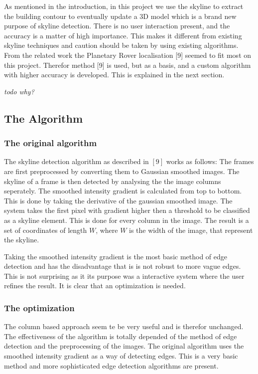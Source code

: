 \documentclass[10pt]{article}
\begin{document}
As mentioned in the introduction, in this project we use the skyline to extract
the building contour to eventually update a 3D model which is a brand new
purpose of skyline detection.  There is no user interaction present, and the
accuracy is a matter of high importance.  This makes it different from existing
skyline techniques and caution should be taken by using existing algorithms.
From the related work the Planetary Rover localisation [9] seemed to fit most on
this project.  Therefor method [9] is used, but as a basis, and a custom
algorithm with higher accuracy is developed. This is explained in the next
section.


\textit{todo why?}
 \subsection{The Algorithm}
 \subsubsection{The original algorithm}
The skyline detection algorithm as described in $[9]$ works as follows:
The frames are first preprocessed by converting them to Gaussian smoothed images.
The skyline of a frame is then detected by analysing the the image columns
seperately.
The smoothed intensity gradient is calculated from top to bottom. This is done
by taking the derivative of the gaussian smoothed image.
The system takes the first pixel with gradient higher then a threshold to be
classified as a skyline element.  This is done for every column in the image.
The result is a set of coordinates of length $W$,
where $W$ is the width of the image, that represent the skyline.

Taking the smoothed intensity gradient is the most basic method of edge
detection and has the disadvantage that is is not robust to more vague
edges. This is not surprising as it its purpose was a interactive system where the
user refines the result. It is clear that an optimization is needed.

  \subsubsection{The optimization}
The column based approach seem te be very useful and is therefor unchanged. 
The effectiveness of the algorithm is totally depended of the method of edge
detection and the preprocessing of the images. 
The original algorithm uses the smoothed intensity gradient as a way of
detecting edges. This is a very basic method and more sophisticated edge
detection algorithms are present.\\
\end{document}
